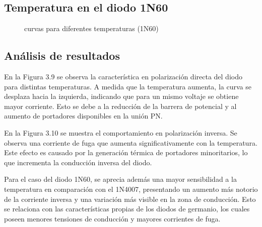 \subsection{Temperatura en el diodo 1N60}

\begin{figure}[H]
\centering
{}
\caption{curvas para diferentes temperaturas  (1N60)}
\end{figure}

\subsection{Análisis de resultados}

En la Figura 3.9 se observa la característica en polarización directa del diodo para
distintas temperaturas. A medida que la temperatura aumenta, la curva se desplaza hacia
la izquierda, indicando que para un mismo voltaje se obtiene mayor corriente. Esto se
debe a la reducción de la barrera de potencial y al aumento de portadores disponibles en
la unión PN.

En la Figura 3.10 se muestra el comportamiento en polarización inversa. Se observa
una corriente de fuga que aumenta significativamente con la temperatura. Este efecto
es causado por la generación térmica de portadores minoritarios, lo que incrementa la
conducción inversa del diodo.

Para el caso del diodo 1N60, se aprecia además una mayor sensibilidad a la temperatura
en comparación con el 1N4007, presentando un aumento más notorio de la corriente
inversa y una variación más visible en la zona de conducción. Esto se relaciona con las
características propias de los diodos de germanio, los cuales poseen menores tensiones
de conducción y mayores corrientes de fuga.

